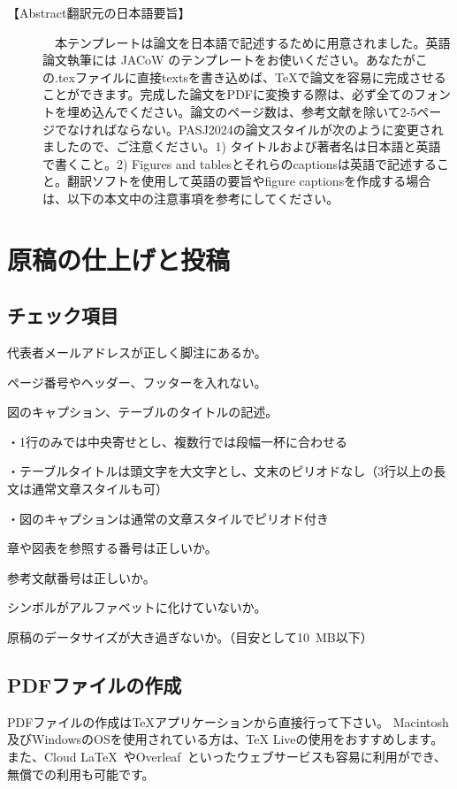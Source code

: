 \documentclass{PASJ2024}
\begin{document}
【Abstract翻訳元の日本語要旨】
\begin{description}
\item[]
{
　本テンプレートは論文を日本語で記述するために用意されました。英語論文執筆には JACoW のテンプレートをお使いください。あなたがこの.texファイルに直接textsを書き込めば、{\TeX}で論文を容易に完成させることができます。完成した論文をPDFに変換する際は、必ず全てのフォントを埋め込んでください。論文のページ数は、参考文献を除いて2-5ページでなければならない。PASJ2024の論文スタイルが次のように変更されましたので、ご注意ください。1) タイトルおよび著者名は日本語と英語で書くこと。2) Figures and tablesとそれらのcaptionsは英語で記述すること。翻訳ソフトを使用して英語の要旨やfigure captionsを作成する場合は、以下の本文中の注意事項を参考にしてください。%
}
\end{description}
%
\section{原稿の仕上げと投稿}
%
\subsection{チェック項目}
%
\begin{Itemize}
%
\item 代表者メールアドレスが正しく脚注にあるか。
%
\item ページ番号やヘッダー、フッターを入れない。
%
\item 図のキャプション、テーブルのタイトルの記述。

・1行のみでは中央寄せとし、複数行では段幅一杯に合わせる

・テーブルタイトルは頭文字を大文字とし、文末のピリオドなし（3行以上の長文は通常文章スタイルも可）

・図のキャプションは通常の文章スタイルでピリオド付き
%
\item 章や図表を参照する番号は正しいか。
%
\item 参考文献番号は正しいか。
%
\item シンボルがアルファベットに化けていないか。
%
\item 原稿のデータサイズが大き過ぎないか。（目安として10~MB以下）
%
\end{Itemize}
%
\subsection{PDFファイルの作成}
PDFファイルの作成は{\TeX}アプリケーションから直接行って下さい。%
Macintosh及びWindowsのOSを使用されている方は、TeX Live\cite{MacTeX,WindowsTeX}の使用をおすすめします。
また、Cloud LaTeX~\cite{Cloudlatex}やOverleaf~\cite{Overleaf}といったウェブサービスも容易に利用ができ、無償での利用も可能です。
%
\end{document}
